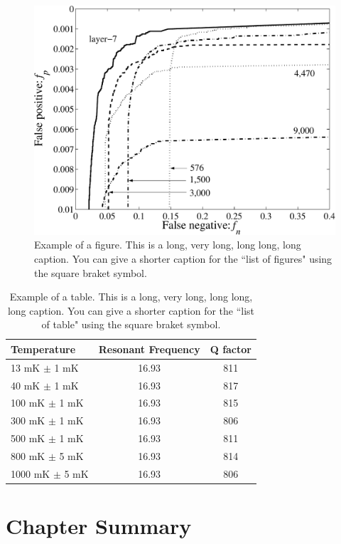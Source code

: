 \documentclass{utmthesis}
\begin{document}
\begin{figure}[p]
	\centering
	\includegraphics[width=\linewidth]{./figs/roc_TREC}
	\caption[Short version of the caption.]{Example of a figure. This is a long, very long, long long, long caption.  You can give a shorter caption for the ``list of figures" using the square braket symbol.}
\end{figure}


\begin{table}[p]
\centering
\caption[Short version of the caption.]{Example of a table. This is a long, very long, long long, long caption.  You can give a shorter caption for the ``list of table" using the square braket symbol.}
\vspace{\baselineskip}
\begin{tabular}{l c c}
  \hline
  \hline
  Temperature & Resonant Frequency & Q factor\\
  \hline
  13 mK $\pm$ 1 mK & 16.93 & 811 \\
  40 mK $\pm$ 1 mK & 16.93 & 817 \\
  100 mK $\pm$ 1 mK & 16.93 & 815 \\
  300 mK $\pm$ 1 mK & 16.93 & 806\\
  500 mK $\pm$ 1 mK & 16.93 & 811\\
  800 mK $\pm$ 5 mK & 16.93 & 814\\
  1000 mK $\pm$ 5 mK & 16.93 & 806 \\
  \hline
  \hline
\end{tabular}
\end{table}

\section{Chapter Summary}
\end{document}
